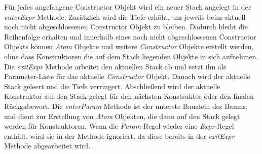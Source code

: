Für jedes angefangene Constructor Objekt wird ein neuer Stack angelegt in der \textit{enterExpr} Methode.
Zusätzlich wird die Tiefe erhöht, um jeweils beim aktuell noch nicht abgeschlossenen Constructor Objekt zu bleiben.
Dadurch bleibt die Reihenfolge erhalten und innerhalb eines noch nicht abgeschlossenen Constructor Objekts können
\textit{Atom} Objekte und weitere \textit{Constructor} Objekte erstellt werden, ohne dass Konstruktoren die
auf dem Stack liegenden Objekte in sich aufnehmen.
\newline
\newline
Die \textit{exitExpr} Methode arbeitet den aktuellen Stack ab und setzt ihn als Parameter-Liste für das
aktuelle \textit{Constructor} Objekt.
Danach wird der aktuelle Stack geleert und die Tiefe verringert.
Abschließend wird der aktuelle Konstruktor auf den Stack gelegt für den nächsten Konstruktor oder
den finalen Rückgabewert.
\newline
\newline
Die \textit{enterParam} Methode ist der unterste Baustein des Baums,
und dient zur Erstellung von \textit{Atom} Objekten, die dann auf den Stack gelegt werden für Konstruktoren.
Wenn die \textit{Param} Regel wieder eine \textit{Expr} Regel enthält, wird sie in der Methode ignoriert,
da diese bereits in der \textit{exitExpr} Methode abgearbeitet wird.

\newpage